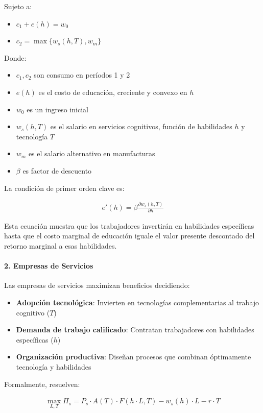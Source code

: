 \documentclass{article}
\theoremstyle{remark}
\theoremstyle{definition}
\begin{document}
\begin{tcolorbox}
Sujeto a:
\begin{itemize}
\item $c_1 + e(h) = w_0$
\item $c_2 = \max\{w_s(h,T), w_m\}$
\end{itemize}

Donde:
\begin{itemize}
\item $c_1, c_2$ son consumo en períodos 1 y 2
\item $e(h)$ es el costo de educación, creciente y convexo en $h$
\item $w_0$ es un ingreso inicial
\item $w_s(h,T)$ es el salario en servicios cognitivos, función de habilidades $h$ y tecnología $T$
\item $w_m$ es el salario alternativo en manufacturas
\item $\beta$ es factor de descuento
\end{itemize}

La condición de primer orden clave es:

\begin{align}
e'(h) = \beta \frac{\partial w_s(h,T)}{\partial h}
\end{align}

Esta ecuación muestra que los trabajadores invertirán en habilidades específicas hasta que el costo marginal de educación iguale el valor presente descontado del retorno marginal a esas habilidades.

\paragraph{2. Empresas de Servicios}
Las empresas de servicios maximizan beneficios decidiendo:

\begin{itemize}
\item \textbf{Adopción tecnológica}: Invierten en tecnologías complementarias al trabajo cognitivo ($T$)
\item \textbf{Demanda de trabajo calificado}: Contratan trabajadores con habilidades específicas ($h$)
\item \textbf{Organización productiva}: Diseñan procesos que combinan óptimamente tecnología y habilidades
\end{itemize}

Formalmente, resuelven:

\begin{align}
\max_{L,T} \Pi_s = P_s \cdot A(T) \cdot F(h \cdot L, T) - w_s(h) \cdot L - r \cdot T
\end{align}


\end{tcolorbox}
\end{document}
